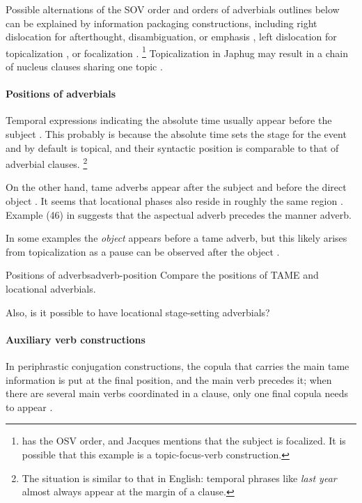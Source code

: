 \documentclass[a4paper, oneside, 12pt]{report}
\newcommand*{\citesec}[1]{\S~{#1}}
\newcommand*{\citepage}[1]{p.~{#1}}
\newcommand*{\citepages}[1]{pp.~{#1}}
\newcommand{\form}[1]{\emph{#1}}
\begin{document}
Possible alternations of the SOV order and orders of adverbials outlines below 
can be explained by information packaging constructions,
including right dislocation for afterthought, disambiguation, or emphasis 
\citep[\citesec{22.1.3}]{jacques2021grammar},
left dislocation for topicalization 
\citep[\citepage{1189}]{jacques2021grammar},
or focalization \citep[\citepage{1190}]{jacques2021grammar}.%
\footnote{
    \citep[\citepage{1190}]{jacques2021grammar} has the OSV order,
    and Jacques mentions that the subject is focalized.
    It is possible that this example is a topic-focus-verb construction.
}
Topicalization in Japhug may result in a chain of nucleus clauses sharing one topic
\citep[\citepage{1190}, (11)]{jacques2021grammar}.

\paragraph*{Positions of adverbials}\label{sec:grammatical.clause.template.adverb}
Temporal expressions indicating the absolute time usually appear before the subject
\citep[\citepage{344}, (167); \citepage{283}, (123)]{jacques2021grammar}.
This probably is because the absolute time sets the stage for the event
and by default is topical,
and their syntactic position is comparable to that of adverbial clauses.%
\footnote{
    The situation is similar to that in English:
    temporal phrases like \form{last year} almost always appear at the margin of a clause.
}

On the other hand, \ac{tame} adverbs
appear after the subject and before the direct object
\citep[\citepages{1200-1201,1210}]{jacques2021grammar}.
It seems that locational phases also reside in roughly the same region
\citep[\citepage{302}]{jacques2021grammar}.
Example (46) in \citet[\citepage{1200}]{jacques2021grammar}
suggests that the aspectual adverb precedes the manner adverb.

In some examples the \emph{object} appears before a \ac{tame} adverb,
but this likely arises from topicalization as a pause can be observed after the object
\citep[\citepage{1210}, (82)]{jacques2021grammar}.

\begin{todobox}{Positions of adverbs}{adverb-position}
    Compare the positions of TAME and locational adverbials.
    
    Also, is it possible to have locational stage-setting adverbials?
\end{todobox}

\paragraph*{Auxiliary verb constructions}
In periphrastic conjugation constructions, 
the copula that carries the main \ac{tame} information 
is put at the final position, 
and the main verb precedes it; 
when there are several main verbs coordinated in a clause, 
only one final copula needs to appear \citep[\citepages{1090-1091}]{jacques2021grammar}.
\end{document}
